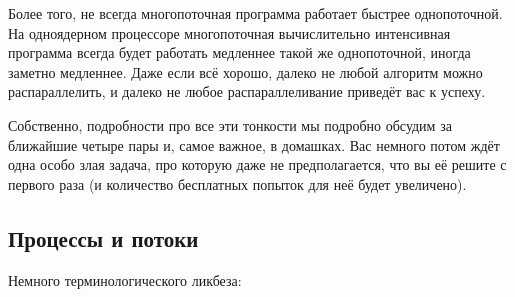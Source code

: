 \documentclass[a5paper]{article}
\begin{document}
Более того, не всегда многопоточная программа работает быстрее однопоточной. На одноядерном процессоре многопоточная вычислительно интенсивная программа всегда будет работать медленнее такой же однопоточной, иногда заметно медленнее. Даже если всё хорошо, далеко не любой алгоритм можно распараллелить, и далеко не любое распараллеливание приведёт вас к успеху. 

Собственно, подробности про все эти тонкости мы подробно обсудим за ближайшие четыре пары и, самое важное, в домашках. Вас немного потом ждёт одна особо злая задача, про которую даже не предполагается, что вы её решите с первого раза (и количество бесплатных попыток для неё будет увеличено).

\subsection{Процессы и потоки}

Немного терминологического ликбеза:
\end{document}

